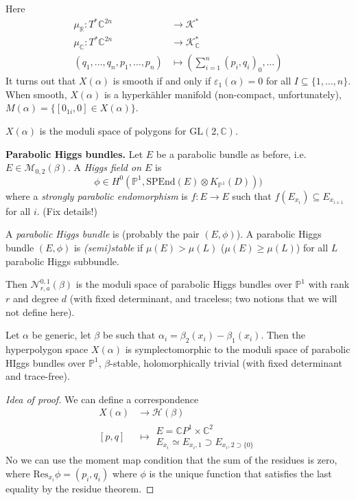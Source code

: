{Here
\begin{align*}
\mu_\mathbb{R}:T^*\mathbb{C}^{2n}&\to \mathcal{K}^* \\
\mu_{\mathbb{C}}:T^*\mathbb{C}^{2n}&  \to \mathcal{K}_{\mathbb{C}}^* \\
(q_1,\ldots,q_n,p_1,\ldots,p_n)&  \mapsto 
(\sum_{i=1}^n(p_i,q_i)_0,\ldots)
\end{align*}
It turns out that $X(\alpha)$ is smooth
if and only if $\varepsilon_1(\alpha)=0$ for all
$I \subseteq \{ 1,\ldots,n\}$.
When smooth,  $X(\alpha)$ is a hyperkähler manifold
(non-compact, unfortunately),
$M(\alpha)=\{[0_{1i},0] \in X(\alpha)\}$.

\begin{theorem}[Boalch]
\label{theorem-Boalch}
$X(\alpha)$ is the moduli space of polygons for $\text{GL}(2,\mathbb{C})$.
\end{theorem}

\medskip\noindent
{\bf Parabolic Higgs bundles.}
Let $E$ be a parabolic bundle as before, i.e.
$E \in \mathcal{M}_{0,2}(\beta)$.
A {\it Higgs field on $E$} is
$$
\phi \in H^{0}(\mathbb{P}^1,\text{SPEnd}(E) \otimes K_{\mathbb{P}^1}(D)))
$$
where a {\it strongly parabolic endomorphism} is  $f:E \to E$
such that $f(E_{x_i})\subseteq E_{x_{i+1}}$ for all $i$.
(Fix details!)

A {\it parabolic Higgs bundle} is (probably the pair $(E,\phi)$).
A parabolic Higgs bundle $(E,\phi)$ is {\it (semi)stable}
if  $\mu(E) > \mu(L)$ ($\mu(E) \geq \mu(L)$) for all 
$L$ parabolic Higgs subbundle.

Then $\mathcal{N}_{r,a}^{0,1}(\beta)$ is the moduli
space of parabolic Higgs bundles over $\mathbb{P}^1$ 
with rank $r$ and degree $d$ (with fixed determinant,
and traceless; two notions that we will not define here).


\begin{theorem}
\label{theorem-GBSFG}
Let $\alpha$ be generic, let $\beta$ 
be such that $\alpha_i=\beta_2(x_i)-\beta_1(x_i)$.
Then the hyperpolygon space $X(\alpha)$ 
is symplectomorphic to the moduli space
of parabolic HIggs bundles over $\mathbb{P}^1$, $\beta$-stable,
holomorphically trivial (with fixed determinant and trace-free).


\begin{proof}[Idea of proof]
We can define a correspondence
\begin{align*}
X(\alpha) &\longrightarrow \mathcal{H}(\beta) \\
[p,q] &\longmapsto \substack{E=\mathbb{C}P^{1}\times \mathbb{C}^2
 \\ E_{x_i}\simeq E_{x_i,1}\supset E_{x_i,2\supset \{0\}}}
\end{align*}
No we can use the moment map condition
that the sum of the residues is zero,
where $\text{Res}_{x_i}\phi=(p_i,q_i)$
where $\phi$ is the unique function
that satisfies the last equality by
the residue theorem.
\end{proof}
\end{theorem}

}
